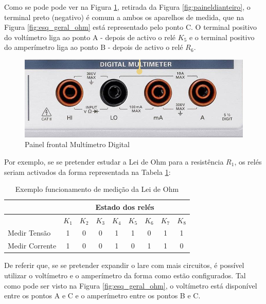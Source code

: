 Como se pode pode ver na Figura \ref{fig:frontDMM}, retirada da Figura \ref{fig:paineldianteiro}, o terminal preto (negativo) é comum a ambos os aparelhos de medida, que na Figura \ref{fig:esq_geral_ohm} está representado pelo ponto C. O terminal positivo do voltímetro liga ao ponto A - depois de activo o relé $K_{5}$ e o terminal positivo do amperímetro liga ao ponto B - depois de activo o relé $R_{6}$.

\begin{figure}[hbtp]
	\centering
	\includegraphics[width=1\textwidth]{figures/promenorDMM.png}
	\caption{Painel frontal Multímetro Digital}
	\label{fig:frontDMM}
\end{figure}

Por exemplo, se se pretender estudar a Lei de Ohm para a resistência $R_{1}$, os relés seriam activados da forma representada na Tabela \ref{Table:exemplomedicaoohm}:

\begin{table}[htb]
	\centering
	\caption{Exemplo funcionamento de medição da Lei de Ohm}
	\label{Table:exemplomedicaoohm}
	\begin{tabular}{lcccccccc}
		\toprule
		               & \multicolumn{8}{c}{Estado dos relés}                                                                       \\
		\midrule
		               & $K_{1}$                              & $K_{2}$ & $K_{3}$ & $K_{4}$ & $K_{5}$ & $K_{6}$ & $K_{7}$ & $K_{8}$ \\
		\midrule
		Medir Tensão   & 1                                    & 0       & 0       & 1       & 1       & 0       & 1       & 1       \\
		\midrule
		Medir Corrente & 1                                    & 0       & 0       & 1       & 0       & 1       & 1       & 0       \\
		\bottomrule
	\end{tabular}
\end{table}

De referir que, se se pretender expandir o \acrshort{lare} com mais circuitos, é possível utilizar o voltímetro e o amperímetro da forma como estão configurados. Tal como pode ser visto na Figura \ref{fig:esq_geral_ohm}, o voltímetro está disponível entre os pontos A e C e o amperímetro entre os pontos B e C.

